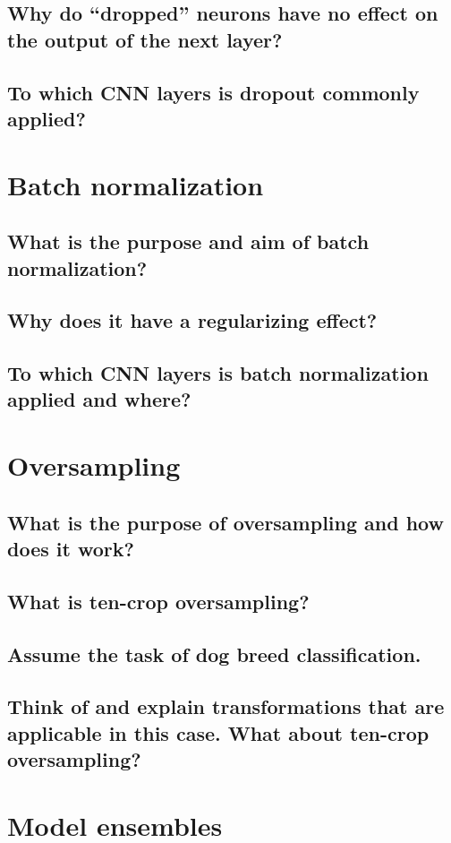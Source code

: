 \subsection{Why do ``dropped'' neurons have no effect on the output of the next layer?}
\subsection{To which CNN layers is dropout commonly applied?}

\section{Batch normalization}
\subsection{What is the purpose and aim of batch normalization?}
\subsection{Why does it have a regularizing effect?}
\subsection{To which CNN layers is batch normalization applied and where?}

\section{Oversampling}
\subsection{What is the purpose of oversampling and how does it work?}
\subsection{What is ten-crop oversampling?}
\subsection{Assume the task of dog breed classification.}
\subsection{Think of and explain transformations that are applicable in this case. What about ten-crop oversampling?}

\section{Model ensembles}
